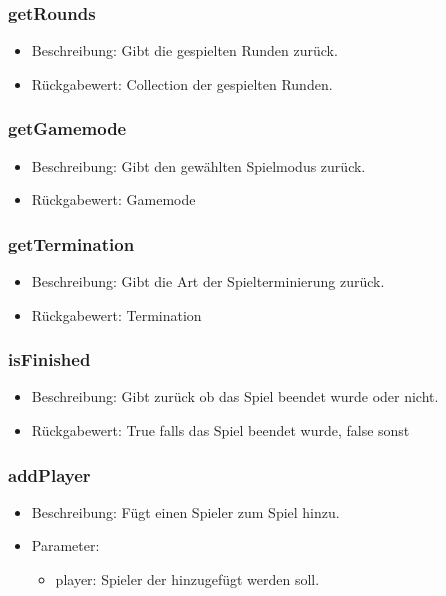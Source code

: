 \documentclass[a4paper]{scrreprt}
\begin{document}
	\subsubsection{getRounds}
	\begin{itemize}
		\item Beschreibung: Gibt die gespielten Runden zurück.
		\item Rückgabewert: Collection der gespielten Runden.
	\end{itemize}
	
	\subsubsection{getGamemode}
	\begin{itemize}
		\item Beschreibung: Gibt den gewählten Spielmodus zurück.
		\item Rückgabewert: Gamemode
	\end{itemize}
	
	\subsubsection{getTermination}
	\begin{itemize}
		\item Beschreibung: Gibt die Art der Spielterminierung zurück.
		\item Rückgabewert: Termination
	\end{itemize}
	
	\subsubsection{isFinished}
	\begin{itemize}
		\item Beschreibung: Gibt zurück ob das Spiel beendet wurde oder nicht.
		\item Rückgabewert: True falls das Spiel beendet wurde, false sonst
	\end{itemize}
	
	\subsubsection{addPlayer}
	\begin{itemize}
		\item Beschreibung: Fügt einen Spieler zum Spiel hinzu.
		\item Parameter:
		\begin{itemize}
			\item player: Spieler der hinzugefügt werden soll.
		\end{itemize}
	\end{itemize}
	
\end{document}
